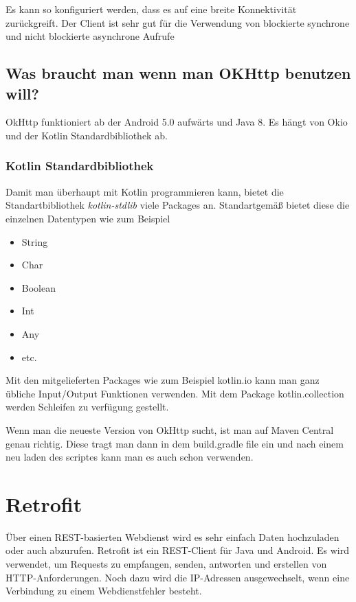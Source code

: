 Es kann so konfiguriert werden, dass es auf eine breite Konnektivität zurückgreift.
Der Client ist sehr gut für die Verwendung von blockierte synchrone und nicht blockierte asynchrone Aufrufe 

\subsection{Was braucht man wenn man OKHttp benutzen will?}
OkHttp funktioniert ab der Android 5.0 aufwärts und Java 8. 
Es hängt von Okio und der Kotlin Standardbibliothek ab.   

\subsubsection{Kotlin Standardbibliothek}
\cite{Kotlin-Standartbibliothek}
Damit man überhaupt mit Kotlin programmieren kann, bietet die Standartbibliothek \textit{kotlin-stdlib} viele Packages an.
Standartgemäß bietet diese die einzelnen Datentypen wie zum Beispiel

\begin{itemize}
    \item String
    \item Char
    \item Boolean
    \item Int
    \item Any
    \item etc.
\end{itemize}

Mit den mitgelieferten Packages wie zum Beispiel kotlin.io kann man ganz übliche Input/Output Funktionen verwenden.
Mit dem Package kotlin.collection werden Schleifen zu verfügung gestellt.

Wenn man die neueste Version von OkHttp sucht, ist man auf Maven Central genau richtig.
Diese tragt man dann in dem build.gradle file ein und nach einem neu laden des scriptes kann man es auch schon verwenden.

\pagebreak

\section{Retrofit}
\cite{Retrofit}
\author{Bozidar Spasenovic}
Über einen REST-basierten Webdienst wird es sehr einfach Daten hochzuladen oder auch abzurufen. 
Retrofit ist ein REST-Client für Java und Android.
Es wird verwendet, um Requests zu empfangen, senden, antworten und erstellen von HTTP-Anforderungen.
Noch dazu wird die IP-Adressen ausgewechselt, wenn eine Verbindung zu einem Webdienstfehler besteht.



